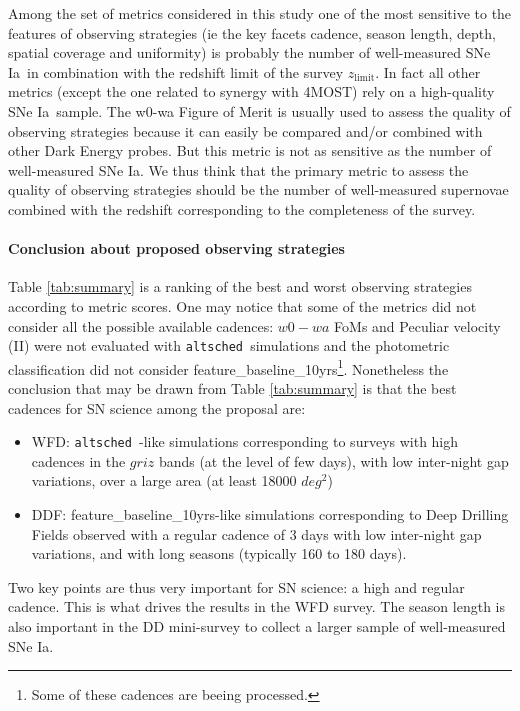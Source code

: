 \documentclass[a4paper,10pt]{article}
\newcommand{\feature}{feature\_baseline\_10yrs}
\newcommand{\zlimit}{$z_{\mathrm{limit}}$}
\newcommand{\altsched}{{\tt altsched\ }}
\newcommand{\sne}{{SNe Ia}}
\begin{document}
Among the set of metrics considered in this study one of the most sensitive to the features of observing strategies (ie the key facets cadence, season length, depth, spatial coverage and uniformity) is probably the number of well-measured \sne~in combination with the redshift limit of the survey \zlimit. In fact all other metrics (except the one related to synergy with 4MOST) rely on a high-quality \sne~sample. The w0-wa Figure of Merit is usually used to assess the quality of observing strategies because it can easily be compared and/or combined with other Dark Energy probes. But this metric is not as sensitive as the number of well-measured \sne. We thus think that the primary metric to assess the quality of observing strategies should be the number of well-measured supernovae combined with the redshift corresponding to the completeness of the survey.


\paragraph{Conclusion about proposed observing strategies}

Table \ref{tab:summary} is a ranking of the best and worst observing strategies according to metric scores. One may notice that some of the metrics did not consider all the possible available cadences: $w0-wa$ FoMs and Peculiar velocity (II) were not evaluated with \altsched simulations and the photometric classification did not consider \feature\footnote{Some of these cadences are beeing processed.}. Nonetheless the conclusion that may be drawn from Table \ref{tab:summary} is that the best cadences for SN science among the proposal are:
\begin{itemize}
\item WFD: \altsched-like simulations corresponding to surveys with high cadences in the $griz$ bands (at the level of few days), with low inter-night gap variations, over a large area (at least 18000 $deg^2$) 

\item DDF: \feature-like simulations corresponding to Deep Drilling Fields observed with a regular cadence of 3 days with low inter-night gap variations, and with long seasons (typically 160 to 180 days). 
\end{itemize}

Two key points are thus very important for SN science: a high and regular cadence. This is what drives the results in the WFD survey. The season length is also important in the DD mini-survey to collect a larger sample of well-measured \sne. 
\end{document}
